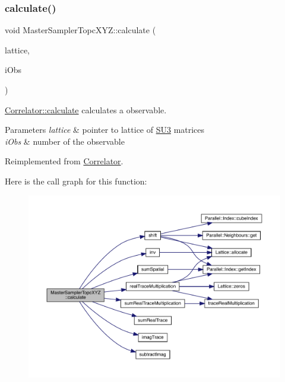\subsubsection{\texorpdfstring{calculate()}{calculate()}}
{\footnotesize\ttfamily void Master\+Sampler\+Topc\+X\+Y\+Z\+::calculate (\begin{DoxyParamCaption}\item[{\mbox{\hyperlink{class_lattice}{Lattice}}$<$ \mbox{\hyperlink{class_s_u3}{S\+U3}} $>$ $\ast$}]{lattice,  }\item[{unsigned int}]{i\+Obs }\end{DoxyParamCaption})\hspace{0.3cm}{\ttfamily [virtual]}}



\mbox{\hyperlink{class_correlator_ab33502ff305f891c5c2e6d66a26a0247}{Correlator\+::calculate}} calculates a observable. 


\begin{DoxyParams}{Parameters}
{\em lattice} & pointer to lattice of \mbox{\hyperlink{class_s_u3}{S\+U3}} matrices \\
\hline
{\em i\+Obs} & number of the observable \\
\hline
\end{DoxyParams}


Reimplemented from \mbox{\hyperlink{class_correlator_ab33502ff305f891c5c2e6d66a26a0247}{Correlator}}.

Here is the call graph for this function\+:\nopagebreak
\begin{figure}[H]
\begin{center}
\leavevmode
\includegraphics[width=350pt]{class_master_sampler_topc_x_y_z_a0ea80ad9935db791f00461b7dfd548b7_cgraph}
\end{center}
\end{figure}
\mbox{\label{class_master_sampler_topc_x_y_z_a49ef8ccce4bf9473017bbb7c01f1404b}} 
